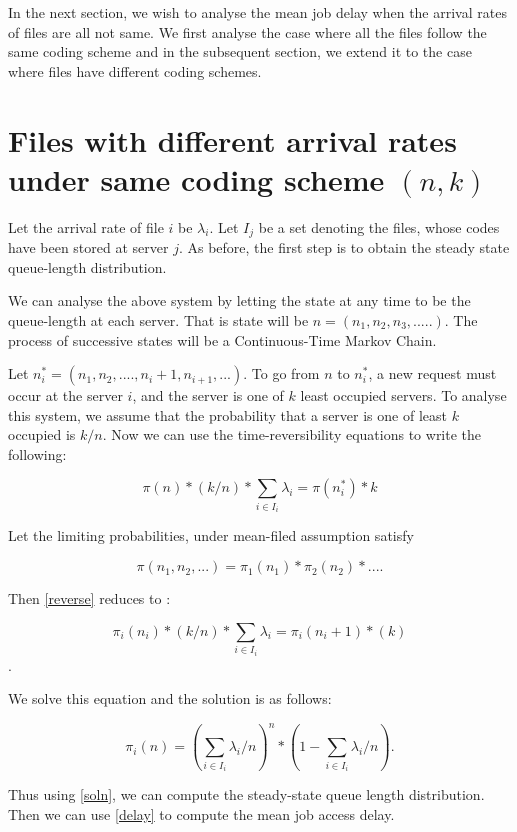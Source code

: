 \documentclass{article}
\begin{document}
In the next section, we wish to analyse the mean job delay when the arrival rates of files are all not same. We first analyse the case where all the files follow the same coding scheme and in the subsequent section, we extend it to the case where files have different coding schemes. 

\section{Files with different arrival rates under same coding scheme $(n,k)$}

Let the arrival rate of file $i$ be $\lambda_{i}$. Let $I_{j}$ be a set denoting the files, whose codes have been stored at server $j$. As before, the first step is to obtain the steady state queue-length distribution.

We can analyse the above system by letting the state at any time to be the queue-length at each server. That is state will be $n = (n_{1},n_{2},n_{3},.....)$. The process of successive states will be a Continuous-Time Markov Chain. 

Let $n_{i}^{*} = (n_{1},n_{2},....,n_{i}+1,n_{i+1},...)$. To go from $n$ to $n_{i}^{*}$, a new request must occur at the server $i$, and the server is one of $k$ least occupied servers. To analyse this system, we assume that the probability that a server is one of least $k$ occupied is $k/n$. Now we can use the time-reversibility equations to write the following:

\begin{equation} \label{reverse}
\pi(n)*(k/n)*\sum_{i \in I_{i}}\lambda_{i} = \pi(n_{i}^{*})*k 
\end{equation} 

Let the limiting probabilities, under mean-filed assumption satisfy 

$$ \pi(n_{1},n_{2},...) = \pi_{1}(n_{1})*\pi_{2}(n_{2})*....$$

Then \eqref{reverse} reduces to :

$$ \pi_{i}(n_{i})*(k/n)*\sum_{i \in I_{i}}\lambda_{i}  = \pi_{i}(n_{i}+1)*(k) $$. 

We solve this equation and the solution is as follows:

\begin{equation}\label{soln}
\pi_{i}(n) = (\sum_{i \in I_{i}}\lambda_{i}/n)^{n} * (1 - \sum_{i \in I_{i}}\lambda_{i}/n).
\end{equation}

Thus using \eqref{soln}, we can compute the steady-state queue length distribution. Then we can use \eqref{delay} to compute the mean job access delay. 
\end{document}

